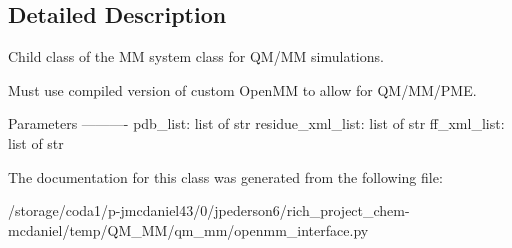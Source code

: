\subsection{Detailed Description}
\begin{DoxyVerb}Child class of the MM system class for QM/MM simulations.

Must use compiled version of custom OpenMM to allow for QM/MM/PME.

Parameters
----------
pdb_list: list of str
residue_xml_list: list of str
ff_xml_list: list of str
\end{DoxyVerb}
 

The documentation for this class was generated from the following file\-:\begin{DoxyCompactItemize}
\item 
/storage/coda1/p-\/jmcdaniel43/0/jpederson6/rich\-\_\-project\-\_\-chem-\/mcdaniel/temp/\-Q\-M\-\_\-\-M\-M/qm\-\_\-mm/openmm\-\_\-interface.\-py\end{DoxyCompactItemize}
